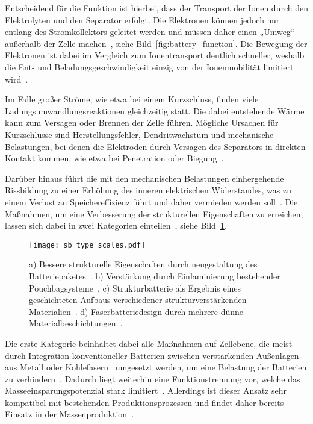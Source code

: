 Entscheidend für die Funktion ist hierbei, dass der Transport der Ionen durch den Elektrolyten und den Separator erfolgt. Die Elektronen können jedoch nur entlang des Stromkollektors geleitet werden und müssen daher einen „Umweg“ außerhalb der Zelle machen~\cite{Plett2015}, siehe Bild~\ref{fig:battery_function}. Die Bewegung der Elektronen ist dabei im Vergleich zum Ionentransport deutlich schneller, weshalb die Ent- und Beladungsgeschwindigkeit einzig von der Ionenmobilität limitiert wird~\cite{Plett2024}.

Im Falle großer Ströme, wie etwa bei einem Kurzschluss, finden viele Ladungsumwandlungsreaktionen gleichzeitig statt. Die dabei entstehende Wärme kann zum Versagen oder Brennen der Zelle führen. Mögliche Ursachen für Kurzschlüsse sind Herstellungsfehler, Dendritwachstum und mechanische Belastungen, bei denen die Elektroden durch Versagen des Separators in direkten Kontakt kommen, wie etwa bei Penetration oder Biegung~\cite{Beard2019}.

Darüber hinaus führt die mit den mechanischen Belastungen einhergehende Rissbildung zu einer Erhöhung des inneren elektrischen Widerstandes, was zu einem Verlust an Speichereffizienz führt und daher vermieden werden soll~\cite{Plett2024}. Die Maßnahmen, um eine Verbesserung der strukturellen Eigenschaften zu erreichen, lassen sich dabei in zwei Kategorien einteilen~\cite{Jin2023}, siehe Bild~\ref{fig:sb_type_scales}.
\begin{figure}[!h]
        \center
		\texttt{[image: sb\_type\_scales.pdf]}
		\caption{\label{fig:sb_type_scales}a) Bessere strukturelle Eigenschaften durch neugestaltung des Batteriepaketes~\cite{Tesla2020}. b) Verstärkung durch Einlaminierung bestehender Pouchbagsysteme~\cite{Pattarakunnan2020}. c) Strukturbatterie als Ergebnis eines geschichteten Aufbaus verschiedener strukturverstärkenden Materialien~\cite{Asp2015}. d) Faserbatteriedesign durch mehrere dünne Materialbeschichtungen~\cite{Thakur2020}.}
\end{figure}

Die erste Kategorie beinhaltet dabei alle Maßnahmen auf Zellebene, die meist durch Integration konventioneller Batterien zwischen verstärkenden Außenlagen aus Metall oder Kohlefasern~\cite{Galos2020,Attar2020} umgesetzt werden, um eine Belastung der Batterien zu verhindern~\cite{Beard2019}. Dadurch liegt weiterhin eine Funktionstrennung vor, welche das Masseeinsparungspotenzial stark limitiert~\cite{Jin2023}. Allerdings ist dieser Ansatz sehr kompatibel mit bestehenden Produktionsprozessen und findet daher bereits Einsatz in der Massenproduktion~\cite{Tesla2020}.

